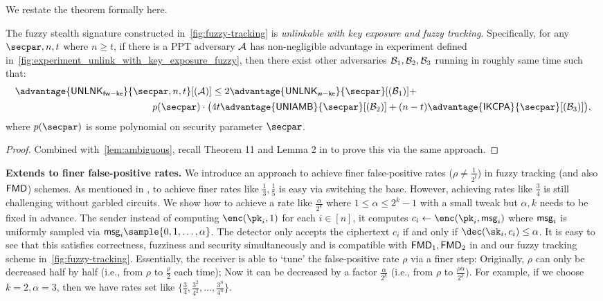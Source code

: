 We restate the theorem formally here.
\begin{theorem}
\label{thm:pqfmd-unlink}
The fuzzy stealth signature constructed in~\cref{fig:fuzzy-tracking} is \emph{unlinkable with key exposure and fuzzy tracking}. Specifically, for any $\secpar, n, t$ where $n\ge t$, if there is a PPT adversary $\mathcal{A}$ has non-negligible advantage in experiment defined in~\cref{fig:experiment_unlink_with_key_exposure_fuzzy}, then there exist other adversaries $\mathcal{B}_1,\mathcal{B}_2,\mathcal{B}_3$ running in roughly same time such that:
\begin{align*}
  \advantage{\unlinkfwke}{\secpar,n,t}[(\Ac)]  &\le 2\advantage{\unlinkwke}{\secpar}[(\Bc_1)] + \\   p(\secpar)\cdot\big(& 4t\advantage{\uniamb}{\secpar}[(\Bc_2)] + (n-t)\advantage{\ikcpa}{\secpar}[(\Bc_3)]\big),
\end{align*}
where $p(\secpar)$ is some polynomial on security parameter $\secpar$.
\end{theorem}
\begin{proof}
Combined with~\cref{lem:ambiguous}, recall Theorem 11 and Lemma 2 in \cite{CCS:BLMG21} to prove this via the same approach.
\end{proof}

\smallskip\noindent\textbf{Extends to finer false-positive rates.}
We introduce an approach to achieve finer false-positive rates ($\rho\ne\frac{1}{2^t}$) in fuzzy tracking (and also $\mathsf{FMD}$) schemes.
As mentioned in \cite{CCS:BLMG21}, to achieve finer rates like $\frac{1}{3}, \frac{1}{5}$ is easy via switching  the base. However, achieving rates like $\frac{3}{4}$ is still challenging without garbled circuits. We show how to achieve a rate like $\frac{\alpha}{2^k}$ where $1\le\alpha\le 2^k-1$ with a small tweak but $\alpha,k$ needs to be fixed in advance. The sender instead of computing $\enc(\pk_i,1)$ for each $i\in[n]$, it computes $c_i\gets\enc(\pk_i, \msg_i)$ where $\mathsf{msg}_i$ is uniformly sampled via $\msg_i\sample \{0,1,\dots,\alpha\}$. The detector only accepts the ciphertext $c_i$ if and only if $\dec(\sk_i,c_i)\le\alpha$. It is easy to see that this satisfies correctness, fuzziness and security simultaneously and is compatible with $\mathsf{FMD}_1,\mathsf{FMD}_2$ in \cite{CCS:BLMG21} and our fuzzy tracking scheme in~\cref{fig:fuzzy-tracking}. Essentially, the receiver is able to `tune' the false-positive rate $\rho$ via a finer step: Originally, $\rho$ can only be decreased half by half (i.e., from $\rho$ to $\frac{\rho}{2}$ each time); Now it can be decreased by a factor $\frac{\alpha}{2^k}$ (i.e., from $\rho$ to $\frac{\rho\alpha}{2^k}$). For example, if we choose $k=2, \alpha=3$, then we have rates set like $\{\frac{3}{4},\frac{3^2}{4^2},\dots,\frac{3^n}{4^n}\}$.

